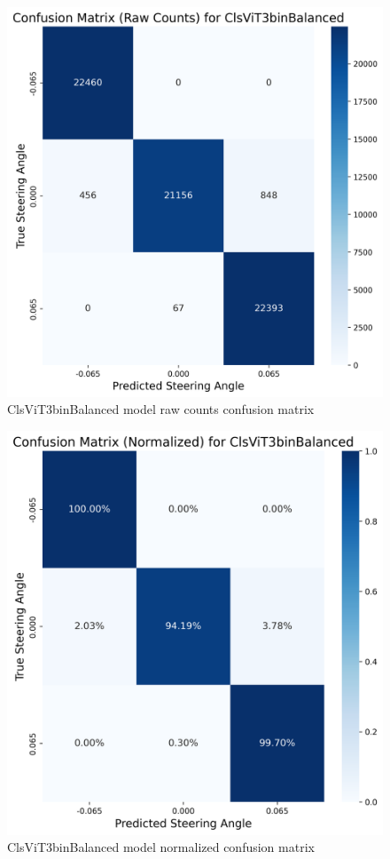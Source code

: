 
\begin{figure}[H]
\centering
\includegraphics[width=0.65\linewidth]{Figures/Results/cm_raw_ClsViT3binBalanced.png}
\caption{ClsViT3binBalanced model raw counts confusion matrix}
\label{fig:cm_raw_ClsViT3binBalanced}
\end{figure}


\begin{figure}[H]
\centering
\includegraphics[width=0.65\linewidth]{Figures/Results/cm_norm_ClsViT3binBalanced.png}
\caption{ClsViT3binBalanced model normalized confusion matrix}
\label{fig:cm_norm_ClsViT3binBalanced}
\end{figure}

